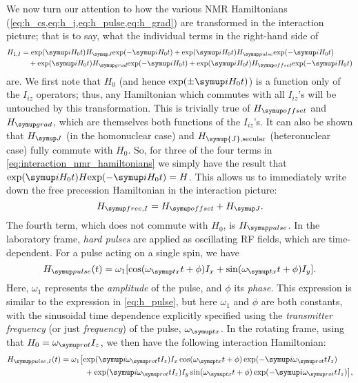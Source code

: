 We now turn our attention to how the various NMR Hamiltonians (\cref{eq:h_cs,eq:h_j,eq:h_pulse,eq:h_grad}) are transformed in the interaction picture; that is to say, what the individual terms in the right-hand side of
\begin{equation}
    \label{eq:interaction_nmr_hamiltonians}
    \begin{aligned}
        H_{1,I} &= \exp(\mi H_0 t) \HJ \!\exp(-\mi H_0 t) + \exp(\mi H_0 t) \Hpulse \!\exp(-\mi H_0 t) \\
                &\quad + \exp(\mi H_0 t) \Hgrad \!\exp(-\mi H_0 t) + \exp(\mi H_0 t) \Hoffset \!\exp(-\mi H_0 t)
    \end{aligned}
\end{equation}
are.
We first note that $H_0$ (and hence $\exp(\pm \mi H_0t)$) is a function only of the $I_{iz}$ operators; thus, any Hamiltonian which commutes with all $I_{iz}$'s will be untouched by this transformation.
This is trivially true of $\Hoffset$ and $\Hgrad$, which are themselves both functions of the $I_{iz}$'s.
It can also be shown that $\HJ$ (in the homonuclear case) and $H_{\symup{J}\text{,secular}}$ (heteronuclear case) fully commute with $H_0$.
So, for three of the four terms in \cref{eq:interaction_nmr_hamiltonians} we simply have the result that $\exp(\mi H_0t)H\!\exp(-\mi H_0t) = H$.
This allows us to immediately write down the free precession Hamiltonian in the interaction picture:
\begin{equation}
    \label{eq:h_free_interaction}
    \HfreeI = \Hoffset + \HJ.
\end{equation}
The fourth term, which does not commute with $H_0$, is $\Hpulse$.
In the laboratory frame, \textit{hard pulses} are applied as oscillating RF fields, which are time-dependent.
For a pulse acting on a single spin, we have
\begin{equation}
    \label{eq:hard_pulse}
    \Hpulse(t) = \omega_1 [\cos(\omegatx t + \phi) I_x + \sin(\omegatx t + \phi) I_y].
\end{equation}
Here, $\omega_1$ represents the \textit{amplitude} of the pulse, and $\phi$ its \textit{phase}. This expression is similar to the expression in \cref{eq:h_pulse}, but here $\omega_1$ and $\phi$ are both constants, with the sinusoidal time dependence explicitly specified using the \textit{transmitter frequency} (or just \textit{frequency}) of the pulse, $\omegatx$.
In the rotating frame, using that $H_0 = \omegarot I_z$, we then have the following interaction Hamiltonian:
\begin{equation}
    \label{eq:hard_pulse_rotatingframe_intermediate}
    \begin{aligned}
        \HpulseI(t) &= \omega_1 \big[\! \exp(\mi \omegarot t I_z) I_x \cos(\omegatx t + \phi) \exp(-\mi \omegarot t I_z) \\
                 &\quad\quad\quad + \exp(\mi \omegarot t I_z) I_y \sin(\omegatx t + \phi) \exp(-\mi \omegarot t I_z) \big],
    \end{aligned}
\end{equation}
